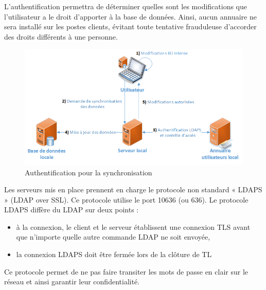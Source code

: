 L’authentification permettra de déterminer quelles sont les modifications que l’utilisateur a le droit d’apporter à la base de données. Ainsi, aucun annuaire ne sera installé sur les postes clients, évitant toute tentative frauduleuse d’accorder des droits différents à une personne.
\begin{figure}[htbp]
	\centering
	\includegraphics[scale=0.9]{Images/SchemaAuthentification.png}
	\caption{Authentification pour la synchronisation}
	\label{SchemaAuthentification}
\end{figure}

Les serveurs mis en place prennent en charge le protocole non standard « LDAPS » (LDAP over SSL). Ce protocole utilise le port 10636 (ou 636). Le protocole LDAPS diffère du LDAP sur deux points :
\begin{itemize}
\item à la connexion, le client et le serveur établissent une connexion TLS avant que n'importe quelle autre commande LDAP ne soit envoyée,
\item la connexion LDAPS doit être fermée lors de la clôture de TL
\end{itemize}

Ce protocole permet de ne pas faire transiter les mots de passe en clair sur le réseau et ainsi garantir leur confidentialité.
